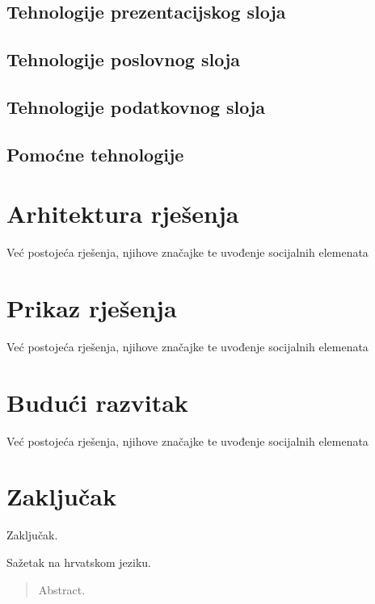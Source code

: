 \documentclass[times, utf8, zavrsni]{fer}
\begin{document}
	\section{Tehnologije prezentacijskog sloja}
	
	\section{Tehnologije poslovnog sloja}

	\section{Tehnologije podatkovnog sloja}
	
	\section{Pomoćne tehnologije}


\chapter{Arhitektura rješenja}
Već postojeća rješenja, njihove značajke te uvođenje socijalnih elemenata

\chapter{Prikaz rješenja}
Već postojeća rješenja, njihove značajke te uvođenje socijalnih elemenata

\chapter{Budući razvitak}
Već postojeća rješenja, njihove značajke te uvođenje socijalnih elemenata

\chapter{Zaključak}
Zaključak.




\begin{sazetak}
Sažetak na hrvatskom jeziku.

\end{sazetak}

\begin{abstract}
Abstract.

\end{abstract}
\end{document}
